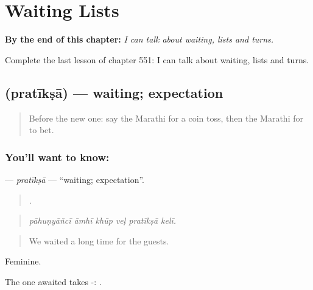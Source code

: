 
\chapter{Waiting Lists}
\label{ch:mr-waiting-lists}

\begin{chapteropening}
\textbf{By the end of this chapter:} \emph{I can talk about waiting, lists and turns.}

Complete the last lesson of chapter 551: I can talk about waiting, lists and turns.
\end{chapteropening}

\section[\texorpdfstring{\mr{प्रतीक्षा} (pratīkṣā)}{प्रतीक्षा (pratīkṣā)}]{ (pratīkṣā) — waiting; expectation}

\label{lesson:MR-C551-pratiksa}



\begin{quote}
Before the new one: say the Marathi for a coin toss, then the Marathi for to bet.
\end{quote}

\subsection*{You'll want to know: }
\textbf{} — \emph{pratīkṣā} — \textquotedblleft{}waiting; expectation\textquotedblright{}.

\begin{quote}
     .
\end{quote}

\begin{quote}
\emph{pāhuṇyāñcī āmhī khūp veḷ pratīkṣā kelī.}
\end{quote}

\begin{quote}
We waited a long time for the guests.
\end{quote}

Feminine.

The one awaited takes -:   .

